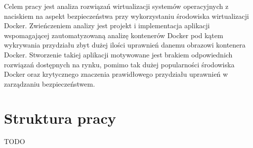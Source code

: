 Celem pracy jest analiza rozwiązań wirtualizacji systemów operacyjnych z naciskiem na aspekt bezpieczeństwa przy wykorzystaniu środowiska wirtualizacji Docker. Zwieńczeniem analizy jest projekt i implementacja aplikacji wspomagającej zautomatyzowaną analizę kontenerów Docker pod kątem wykrywania przydziału zbyt dużej ilości uprawnień danemu obrazowi kontenera Docker. Stworzenie takiej aplikacji motywowane jest brakiem odpowiednich rozwiązań dostępnych na rynku, pomimo tak dużej popularności środowiska Docker oraz krytycznego znaczenia prawidłowego przydziału uprawnień w zarządzaniu bezpieczeństwem.

\section{Struktura pracy}

TODO